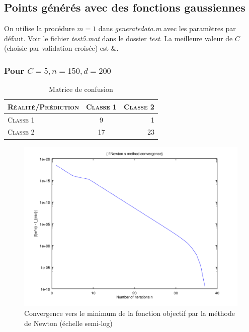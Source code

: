 \documentclass{article}
\begin{document}
\subsection{Points générés avec des fonctions gaussiennes}

On utilise la procédure $m=1$ dans \emph{generatedata.m} avec les paramètres par défaut. Voir le fichier \emph{test5.mat} dans le dossier \emph{test}. La meilleure valeur de $C$ (choisie par validation croisée) est &.

\subsubsection{Pour $C=5, n=150, d=200$}

     \begin{table}[H]
       \caption{Matrice de confusion}
       \begin{tabular}{|l|c|r|}
         \hline
         \textsc{Réalité/Prédiction} & \textsc{Classe 1} & \textsc{Classe 2}\\
         \hline
         \textsc{Classe 1} & 9 & 1\\
         \hline
         \textsc{Classe 2} & 17 & 23\\
         \hline
       \end{tabular}
     \end{table}

         \begin{figure}
           \begin{center}
             \includegraphics[scale=0.5]{images/cvnewton5.png}
             \caption{Convergence vers le minimum de la fonction objectif par la méthode de Newton (échelle semi-log)}
           \end{center}
         \end{figure}
\end{document}
